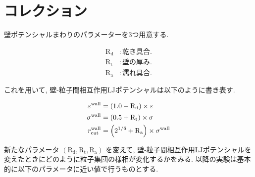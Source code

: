 \documentclass[dvipdfmx]{jsarticle}
\numberwithin{equation}{subsection}
\begin{document}



\section{コレクション}

壁ポテンシャルまわりのパラメーターを3つ用意する.

\begin{align}
  \text{R}_\text{d} &: 乾き具合. \\
  \text{R}_\text{t} &: 壁の厚み. \\
  \text{R}_\text{a} &: 濡れ具合.
\end{align}

これを用いて, 壁-粒子間相互作用LJポテンシャルは以下のように書き表す.

\begin{align}
  \varepsilon^{\text{wall}} &= \qty(1.0 - \text{R}_\text{d}) \times \varepsilon \\
  \sigma^{\text{wall}} &= \qty(0.5 + \text{R}_\text{t}) \times \sigma \\
  r^{\text{wall}}_{\text{cut}} &= \qty(2^{1/6} + \text{R}_\text{a}) \times \sigma^{\text{wall}}
\end{align}

新たなパラメータ $(\text{R}_\text{d}, \text{R}_\text{t}, \text{R}_\text{a})$ を変えて, 壁-粒子間相互作用LJポテンシャルを変えたときにどのように粒子集団の様相が変化するかをみる. 以降の実験は基本的に以下のパラメータに近い値で行うものとする. 
\end{document}
